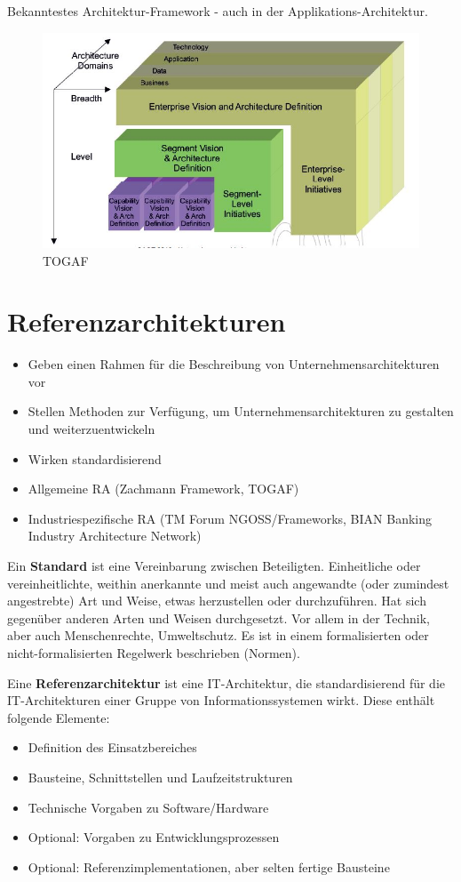 Bekanntestes Architektur-Framework - auch in der Applikations-Architektur.

\begin{figure}[h!]
\centering
\includegraphics[width=0.7\linewidth]{fig/togaf}
\caption{TOGAF}
\label{fig:togaf}
\end{figure}


\section{Referenzarchitekturen}

\begin{itemize}
	\item Geben einen Rahmen für die Beschreibung von Unternehmensarchitekturen vor
	\item Stellen Methoden zur Verfügung, um Unternehmensarchitekturen zu gestalten und weiterzuentwickeln
	\item Wirken standardisierend
	\item Allgemeine RA (Zachmann Framework, TOGAF)
	\item Industriespezifische RA (TM Forum NGOSS/Frameworks, BIAN Banking Industry Architecture Network)
\end{itemize}

Ein \textbf{Standard} ist eine Vereinbarung zwischen Beteiligten. Einheitliche oder vereinheitlichte, weithin anerkannte und meist auch angewandte (oder zumindest angestrebte) Art und Weise, etwas herzustellen oder durchzuführen. Hat sich gegenüber anderen Arten und Weisen durchgesetzt. Vor allem in der Technik, aber auch Menschenrechte, Umweltschutz. Es ist in einem formalisierten oder nicht-formalisierten Regelwerk beschrieben (Normen).

Eine \textbf{Referenzarchitektur} ist eine IT-Architektur, die standardisierend für die IT-Architekturen einer Gruppe von Informationssystemen wirkt. Diese enthält folgende Elemente:
\begin{itemize}
	\item Definition des Einsatzbereiches
	\item Bausteine, Schnittstellen und Laufzeitstrukturen
	\item Technische Vorgaben zu Software/Hardware
	\item Optional: Vorgaben zu Entwicklungsprozessen
	\item Optional: Referenzimplementationen, aber selten fertige Bausteine
\end{itemize}

